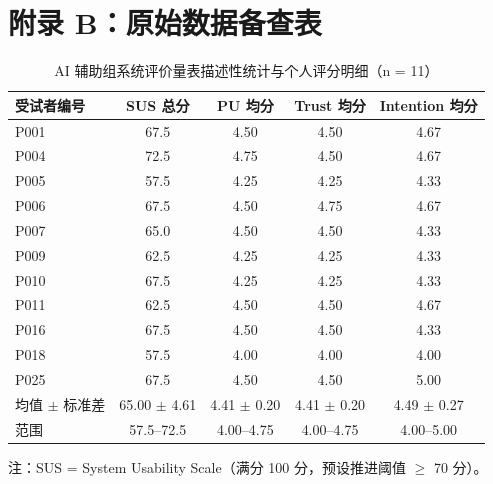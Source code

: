 \clearpage
\section*{附录 B：原始数据备查表}

\begin{table}[htbp]
\centering
\caption{AI 辅助组系统评价量表描述性统计与个人评分明细（n = 11）}
\label{tab:app_sus_full}
\begin{threeparttable}
\begin{tabular}{lcccc}
\toprule
受试者编号 & SUS 总分 & PU 均分 & Trust 均分 & Intention 均分 \\
\midrule
P001               & 67.5 & 4.50 & 4.50 & 4.67 \\
P004               & 72.5 & 4.75 & 4.50 & 4.67 \\
P005               & 57.5 & 4.25 & 4.25 & 4.33 \\
P006               & 67.5 & 4.50 & 4.75 & 4.67 \\
P007               & 65.0 & 4.50 & 4.50 & 4.33 \\
P009               & 62.5 & 4.25 & 4.25 & 4.33 \\
P010               & 67.5 & 4.25 & 4.25 & 4.33 \\
P011               & 62.5 & 4.50 & 4.50 & 4.67 \\
P016               & 67.5 & 4.50 & 4.50 & 4.33 \\
P018               & 57.5 & 4.00 & 4.00 & 4.00 \\
P025               & 67.5 & 4.50 & 4.50 & 5.00 \\
\midrule
均值 $\pm$ 标准差 & 65.00 $\pm$ 4.61 & 4.41 $\pm$ 0.20 & 4.41 $\pm$ 0.20 & 4.49 $\pm$ 0.27 \\
范围             & 57.5--72.5 & 4.00--4.75 & 4.00--4.75 & 4.00--5.00 \\
\bottomrule
\end{tabular}
\begin{tablenotes}[flushleft]\footnotesize
\item 注：SUS = System Usability Scale（满分 100 分，预设推进阈值 $\ge$ 70 分）。
\end{tablenotes}
\end{threeparttable}
\end{table}

